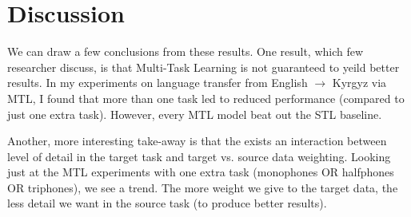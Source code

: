 \documentclass[a4paper]{article}
\begin{document}





\section{Discussion}

We can draw a few conclusions from these results. One result, which few researcher discuss, is that Multi-Task Learning is not guaranteed to yeild better results. In my experiments on language transfer from English $\rightarrow$ Kyrgyz via MTL, I found that more than one task led to reduced performance (compared to just one extra task). However, every MTL model beat out the STL baseline.

Another, more interesting take-away is that the exists an interaction between level of detail in the target task and target vs. source data weighting. Looking just at the MTL experiments with one extra task (monophones OR halfphones OR triphones), we see a trend. The more weight we give to the target data, the less detail we want in the source task (to produce better results).
\end{document}
